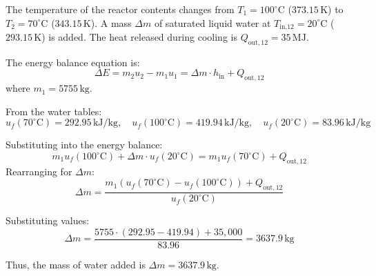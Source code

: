 The temperature of the reactor contents changes from \( T_1 = 100^\circ\text{C} \) (\( 373.15 \, \text{K} \)) to \( T_2 = 70^\circ\text{C} \) (\( 343.15 \, \text{K} \)). A mass \( \Delta m \) of saturated liquid water at \( T_{\text{in,12}} = 20^\circ\text{C} \) (\( 293.15 \, \text{K} \)) is added. The heat released during cooling is \( Q_{\text{out},12} = 35 \, \text{MJ} \).  

The energy balance equation is:  
\[
\Delta E = m_2 u_2 - m_1 u_1 = \Delta m \cdot h_{\text{in}} + Q_{\text{out},12}
\]  
where \( m_1 = 5755 \, \text{kg} \).  

From the water tables:  
\[
u_f(70^\circ\text{C}) = 292.95 \, \text{kJ/kg}, \quad u_f(100^\circ\text{C}) = 419.94 \, \text{kJ/kg}, \quad u_f(20^\circ\text{C}) = 83.96 \, \text{kJ/kg}
\]  

Substituting into the energy balance:  
\[
m_1 u_f(100^\circ\text{C}) + \Delta m \cdot u_f(20^\circ\text{C}) = m_1 u_f(70^\circ\text{C}) + Q_{\text{out},12}
\]  
Rearranging for \( \Delta m \):  
\[
\Delta m = \frac{m_1 \left( u_f(70^\circ\text{C}) - u_f(100^\circ\text{C}) \right) + Q_{\text{out},12}}{u_f(20^\circ\text{C})}
\]  

Substituting values:  
\[
\Delta m = \frac{5755 \cdot (292.95 - 419.94) + 35,000}{83.96} = 3637.9 \, \text{kg}
\]  

Thus, the mass of water added is \( \Delta m = 3637.9 \, \text{kg} \).